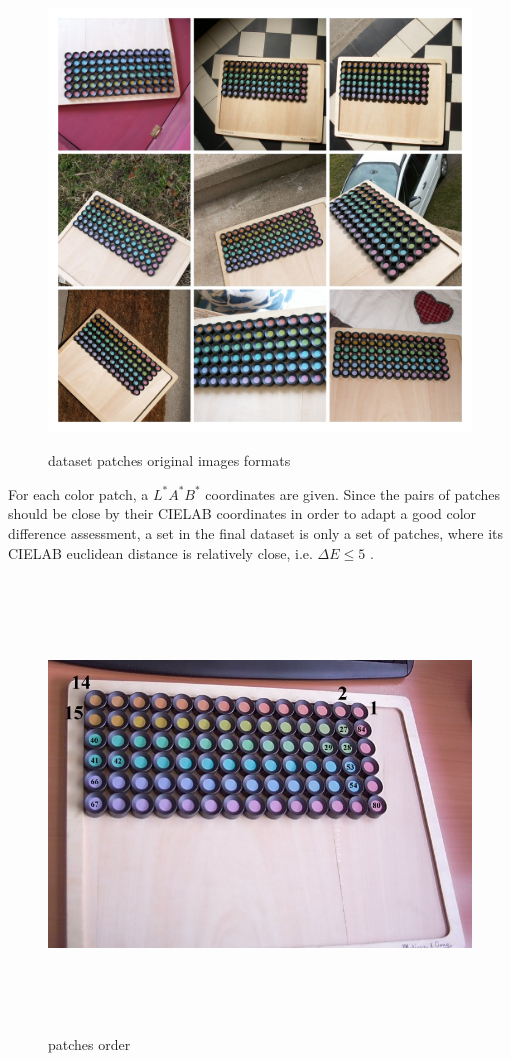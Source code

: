 \begin{figure}[H] \label{set_ds}
			\includegraphics[width=\linewidth,height=12cm,keepaspectratio]{Figures/set_ds}
			\caption[set ds]
			{dataset patches original images formats}
\end{figure}

For each color patch, a $L^*A^*B^*$ \cite{lab} coordinates are given. 
Since the pairs of patches should be close by their CIELAB \cite{CIELAB} coordinates in order to adapt a good color difference assessment, a set in the final dataset is only a set of patches, where its CIELAB euclidean distance is relatively close, i.e. $\Delta E \leq 5$ .


\begin{figure}[H] \label{patch_positions}
			\includegraphics[width=\linewidth,height=12cm,keepaspectratio]{Figures/patch_positions}
			\caption[color patches order in every samples image]
			{patches order}
\end{figure}



